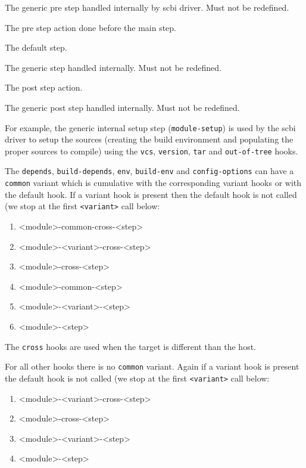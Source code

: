 \documentclass[a4paper,12pt,twoside]{article}
\newcommand{\code}[1]{\texttt{#1}}
\begin{document}
\begin{description}[font=\texttt,style=nextline]
	\item[module-pre-<step>] The generic pre step handled internally by scbi driver. Must not be redefined.
	\item[<module>-pre-<step>] The pre step action done before the main step.
	\item[<module>-<step>] The default step.
	\item[module-<step>] The generic step handled internally. Must not be redefined.
	\item[<module>-post-<step>] The post step action.
	\item[module-post-<step>] The generic post step handled internally. Must not be redefined.
\end{description}

For example, the generic internal setup step (\code{module-setup}) is used by the scbi driver to setup the sources (creating the build environment and populating the proper sources to compile) using the \code{vcs}, \code{version}, \code{tar} and \code{out-of-tree} hooks.

The \code{depends}, \code{build-depends}, \code{env}, \code{build-env} and \code{config-options} can have a \code{common} variant which is cumulative with the corresponding variant hooks or with the default hook. If a variant hook is present then the default hook is not called (we stop at the first \code{<variant>} call below:

\begin{enumerate}
	\item <module>-common-cross-<step>
	\item <module>-<variant>-cross-<step>
	\item <module>-cross-<step>
	\item <module>-common-<step>
	\item <module>-<variant>-<step>
	\item <module>-<step>
\end{enumerate}

The \code{cross} hooks are used when the target is different than the host.

For all other hooks there is no \code{common} variant. Again if a variant hook is present the default hook is not called (we stop at the first \code{<variant>} call below:

\begin{enumerate}
	\item <module>-<variant>-cross-<step>
	\item <module>-cross-<step>
	\item <module>-<variant>-<step>
	\item <module>-<step>
\end{enumerate}
\end{document}
